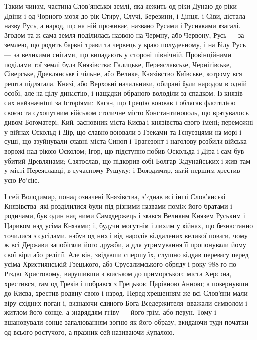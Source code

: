 Таким чином, частина Слов'янської землі, яка лежить од ріки Дунаю до ріки Двіни
і од Чорного моря до рік Стиру, Случі, Березини, і Дінця, і Сіви, дістала назву
Русь, а народ, що на ній проживає, названо Русами і Русняками взагалі. Згодом
та ж сама земля поділилась назвою на Чермну, або Червону, Русь — за землею, що
родить барвні трави та червець у краю полуденному, і на Білу Русь — за великими
снігами, що випадають у стороні північній.  Провінційними поділами тої землі
були Князівства: Галицьке, Переяславське, Чернігівське, Сіверське, Древлянське
і чільне, або Велике, Князівство Київське, котрому вся решта підлягала. Князі,
або Верховні начальники, обирані були народом в одній особі, але на цілу
династію, і нащадки обраного володіли за спадком. Із князів сих найзначніші за
Історіями: Каган, що Грецію воював і облягав флотилією своєю та сухопутним
військом столичне місто Константинополь, що врятувалось дивом Богоматері; Кий,
засновник міста Києва і князівства свого імені; переможні у війнах Оскольд і
Дір, що славно воювали з Греками та Генуезцями на морі і суші, що зруйнували
славні міста Синоп і Трапезонт і наголову розбили війська ворожі над рікою
Осколом; Ігор, що підступно побив Оскольда і Діра і сам був убитий Древлянами;
Святослав, що підкорив собі Болгар Задунайських і жив там у місті Переяславці,
в сучасному Рущуку; і Володимир, який першим хрестив усю Ро'сію.

І сей Володимир, понад означені Князівства, з'єднав всі інші Слов'янські
Князівства, які розділилися були під різними назвами поміж його братами і
родичами, був один над ними Самодержець і звався Великим Князем Руським і
Цариком над усіма Князями; і, будучи могутнім і лихим у війнах, що безнастанно
точилися з сусідами, набув од них і від народів віддалених великої поваги, чому
ж всі Держави запобігали його дружби, а для утримування її пропонували йому
свої віри або релігії. Але він, звідавши спершу їх, слушно віддав перевагу
перед усіма Християнській Грецького, або Єрусалимського обряду і року 988-го по
Різдві Христовому, вирушивши з військом до приморського міста Херсона,
хрестився, там од Греків і побрався з Грецькою Царівною Анною; а повернувши до
Києва, хрестив родину свою і народ. Перед хрещенням же всі Слов'яни мали віру
східних поган і, визнаючи єдиного Бога Вседержителя, вважали символом і житлом
його сонце, а знаряддям гніву — його грім, або перун. Тому і вшановували сонце
запалюванням вогню як його образу, вкидаючи туди початки од всього ростучого, а
празник сей називаючи Купалою.

